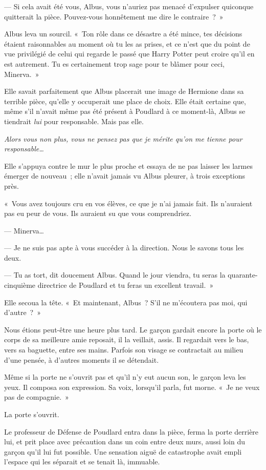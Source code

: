 --- Si cela avait été vous, Albus, vous n'auriez pas menacé d'expulser quiconque quitterait la pièce.
Pouvez-vous honnêtement me dire le contraire~?~»

Albus leva un sourcil.
«~Ton rôle dans ce désastre a été mince, tes décisions étaient raisonnables au moment où tu les as prises, et ce n'est que du point de vue privilégié de celui qui regarde le passé que Harry Potter peut croire qu'il en est autrement.
Tu es certainement trop sage pour te blâmer pour ceci, Minerva.~»

Elle savait parfaitement que Albus placerait une image de Hermione dans sa terrible pièce, qu'elle y occuperait une place de choix.
Elle était certaine que, même s'il n'avait même pas été présent à Poudlard à ce moment-là, Albus se tiendrait \emph{lui} pour responsable.
Mais pas elle.

\emph{Alors vous non plus, vous ne pensez pas que je mérite qu'on me tienne pour responsable…}

Elle s'appuya contre le mur le plus proche et essaya de ne pas laisser les larmes émerger de nouveau~; elle n'avait jamais vu Albus pleurer, à trois exceptions près.

«~Vous avez toujours cru en vos élèves, ce que je n'ai jamais fait.
Ils n'auraient pas eu peur de vous.
Ils auraient su que vous comprendriez.

--- Minerva…

--- Je ne suis pas apte à vous succéder à la direction.
Nous le savons tous les deux.

--- Tu as tort, dit doucement Albus.
Quand le jour viendra, tu seras la quarante-cinquième directrice de Poudlard et tu feras un excellent travail.~»

Elle secoua la tête.
«~Et maintenant, Albus~?
S'il ne m'écoutera pas moi, qui d'autre~?~»

\later

Nous étions peut-être une heure plus tard.
Le garçon gardait encore la porte où le corps de sa meilleure amie reposait, il la veillait, assis.
Il regardait vers le bas, vers sa baguette, entre ses mains.
Parfois son visage se contractait au milieu d'une pensée, à d'autres moments il se détendait.

Même si la porte ne s'ouvrit pas et qu'il n'y eut aucun son, le garçon leva les yeux.
Il composa son expression.
Sa voix, lorsqu'il parla, fut morne.
«~Je ne veux pas de compagnie.~»

La porte s'ouvrit.

Le professeur de Défense de Poudlard entra dans la pièce, ferma la porte derrière lui, et prit place avec précaution dans un coin entre deux murs, aussi loin du garçon qu'il lui fut possible.
Une sensation aiguë de catastrophe avait empli l'espace qui les séparait et se tenait là, immuable.

